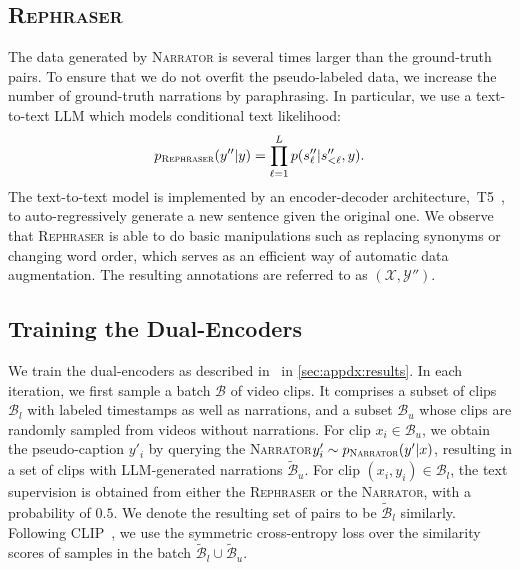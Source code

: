 \documentclass[10pt,twocolumn,letterpaper]{article}
\newcommand{\calX}{\mathcal{X}}
\newcommand{\calY}{\mathcal{Y}}
\newcommand{\narrator}{\textsc{Narrator}\xspace}
\newcommand{\rephraser}{\textsc{Rephraser}\xspace}
\begin{document}
\subsection{\bf \rephraser}
\label{sec:method:paraphrase}
The data generated by \narrator is several times larger than the ground-truth pairs.
To ensure that we do not overfit the pseudo-labeled data, we increase the number of ground-truth narrations by paraphrasing.
In particular, we use a text-to-text LLM which models conditional text likelihood:
{\small
\begin{align*}
	p_\mathrm{\rephraser}(y''\vert y) = \prod_{\ell=1}^L p(s''_\ell \vert s''_{<\ell}, y).
\end{align*}
}
The text-to-text model is implemented by an encoder-decoder architecture,~\eg T5~\cite{raffel2020t5}, to auto-regressively generate a new sentence given the original one.
We observe that \rephraser is able to do basic manipulations such as replacing synonyms or changing word order, which serves as an efficient way of automatic data augmentation. The resulting annotations are referred to as $(\calX, \calY'')$.

\subsection{Training the Dual-Encoders}
\label{sec:method:lavie}
We train the dual-encoders as described in~ in \cref{sec:appdx:results}.
In each iteration, we first sample a batch $\mathcal{B}$ of video clips. It comprises a subset of clips $\mathcal{B}_l$ with labeled timestamps as well as narrations, and a subset $\mathcal{B}_u$ whose clips are randomly sampled from videos without narrations.
For clip $x_i\in\mathcal{B}_u$, we obtain the pseudo-caption $y'_i$ by querying the \narrator $y'_i \sim p_\mathrm{\narrator}(y'|x)$, resulting in a set of clips with LLM-generated narrations $\mathcal{\widetilde{B}}_u$.
For clip $(x_i, y_i)\in\mathcal{B}_l$, the text supervision is obtained from either the \rephraser or the \narrator, with a probability of $0.5$.
We denote the resulting set of pairs to be $\mathcal{\widetilde{B}}_l$ similarly.
Following CLIP~\cite{radford2021clip}, we use the symmetric cross-entropy loss over the similarity scores of samples in the batch $\mathcal{\widetilde{B}}_l \cup \mathcal{\widetilde{B}}_u$.
\end{document}
